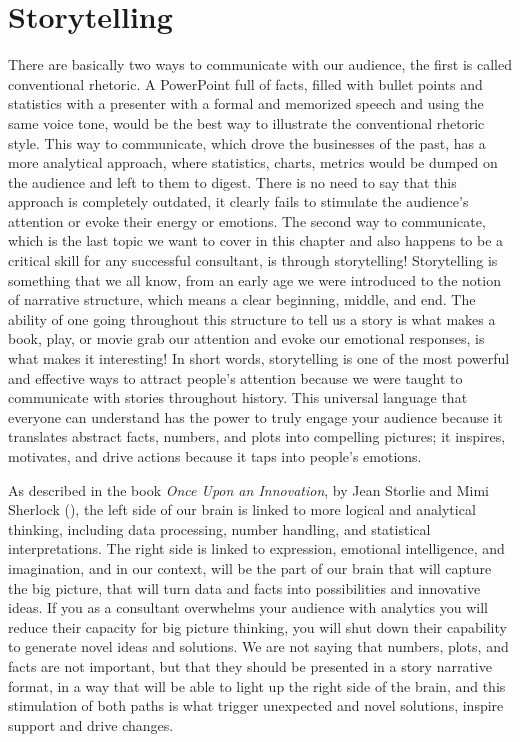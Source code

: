 \documentclass[
]{krantz}
\begin{document}
\hypertarget{storytelling}{%
\section{Storytelling}\label{storytelling}}

There are basically two ways to communicate with our audience, the first is called conventional rhetoric. A PowerPoint full of facts, filled with bullet points and statistics with a presenter with a formal and memorized speech and using the same voice tone, would be the best way to illustrate the conventional rhetoric style. This way to communicate, which drove the businesses of the past, has a more analytical approach, where statistics, charts, metrics would be dumped on the audience and left to them to digest. There is no need to say that this approach is completely outdated, it clearly fails to stimulate the audience's attention or evoke their energy or emotions.
The second way to communicate, which is the last topic we want to cover in this chapter and also happens to be a critical skill for any successful consultant, is through storytelling! Storytelling is something that we all know, from an early age we were introduced to the notion of narrative structure, which means a clear beginning, middle, and end. The ability of one going throughout this structure to tell us a story is what makes a book, play, or movie grab our attention and evoke our emotional responses, is what makes it interesting! In short words, storytelling is one of the most powerful and effective ways to attract people's attention because we were taught to communicate with stories throughout history. This universal language that everyone can understand has the power to truly engage your audience because it translates abstract facts, numbers, and plots into compelling pictures; it inspires, motivates, and drive actions because it taps into people's emotions.

As described in the book \emph{Once Upon an Innovation}, by Jean Storlie and Mimi Sherlock (\citet{Sherlock2020}), the left side of our brain is linked to more logical and analytical thinking, including data processing, number handling, and statistical interpretations. The right side is linked to expression, emotional intelligence, and imagination, and in our context, will be the part of our brain that will capture the big picture, that will turn data and facts into possibilities and innovative ideas. If you as a consultant overwhelms your audience with analytics you will reduce their capacity for big picture thinking, you will shut down their capability to generate novel ideas and solutions. We are not saying that numbers, plots, and facts are not important, but that they should be presented in a story narrative format, in a way that will be able to light up the right side of the brain, and this stimulation of both paths is what trigger unexpected and novel solutions, inspire support and drive changes.
\end{document}
